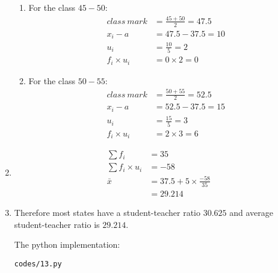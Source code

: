 \begin{enumerate}
\begin{enumerate}
\item For the class $45-50$:
\begin{align*}
class\ mark &= \frac{45+50}{2} = 47.5\\
x_i - a &= 47.5-37.5 = 10\\
u_i &= \frac{10}{5} = 2\\ 
f_i \times u_i &= 0 \times 2 = 0 
\end{align*}

\item For the class $50-55$:
\begin{align*}
class\ mark &= \frac{50+55}{2} = 52.5\\
x_i - a &= 52.5-37.5 = 15\\
u_i &= \frac{15}{5} = 3\\ 
f_i \times u_i &= 2 \times 3 = 6 
\end{align*}

\end{enumerate}

\item 
\begin{align*}
\sum f_i &= 35\\
\sum f_i \times u_i &= -58\\
\bar{x} &= 37.5 + 5 \times \frac{-58}{35}\\
&=29.214
\end{align*}

\item Therefore most states have a student-teacher ratio $30.625$ and average student-teacher ratio is $29.214$.

The python implementation:
\begin{lstlisting}
codes/13.py
\end{lstlisting}


\end{enumerate}
